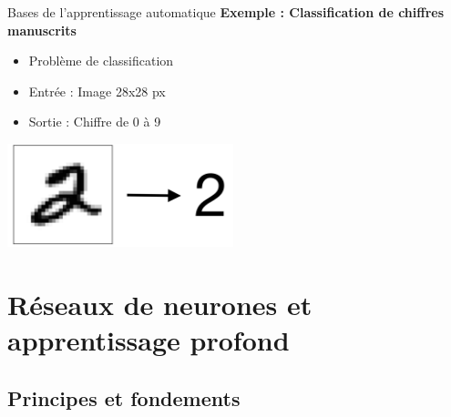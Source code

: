 \documentclass[french]{beamer}
\begin{document}
\begin{frame}{Bases de l'apprentissage automatique}
\vspace{0.5cm}
\textbf{Exemple : Classification de chiffres manuscrits \cite{lecun1998mnist}}
\begin{itemize}
	\item Problème de classification
	\item Entrée : Image 28x28 px
	\item Sortie : Chiffre de 0 à 9
\end{itemize}
\vspace{0.5cm}
\begin{center}
\includegraphics[height=3cm]{figures/mnist-2}
\end{center}
\end{frame}

\section{Réseaux de neurones et apprentissage profond}

\subsection{Principes et fondements}
\end{document}
